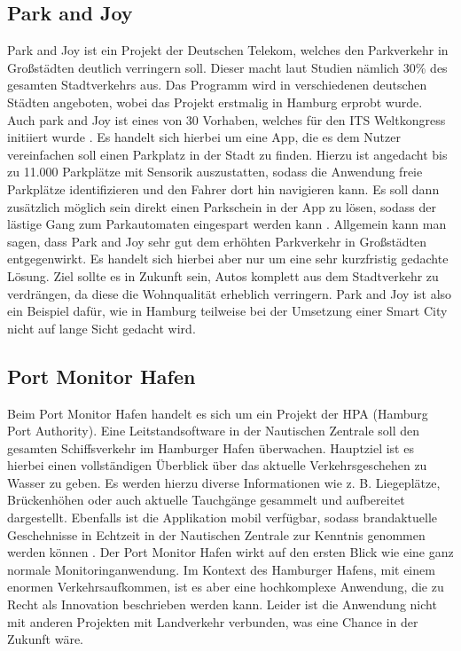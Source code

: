 \subsection{Park and Joy}

Park and Joy ist ein Projekt der Deutschen Telekom, welches den Parkverkehr in Großstädten deutlich verringern soll. Dieser macht laut Studien nämlich 30\% des gesamten Stadtverkehrs aus. Das Programm wird in verschiedenen deutschen Städten angeboten, wobei das Projekt erstmalig in Hamburg erprobt wurde. Auch park and Joy ist eines von 30 Vorhaben, welches für den ITS Weltkongress initiiert wurde \autocite[vgl.][]{SmartCityKompass.2020a}.
Es handelt sich hierbei um eine App, die es dem Nutzer vereinfachen soll einen Parkplatz in der Stadt zu finden. Hierzu ist angedacht bis zu 11.000 Parkplätze mit Sensorik auszustatten, sodass die Anwendung freie Parkplätze identifizieren und den Fahrer dort hin navigieren kann. Es soll dann zusätzlich möglich sein direkt einen Parkschein in der App zu lösen, sodass der lästige Gang zum Parkautomaten eingespart werden kann \autocite[vgl.][]{ParkandJoy.2020}.
Allgemein kann man sagen, dass Park and Joy sehr gut dem erhöhten Parkverkehr in Großstädten entgegenwirkt. Es handelt sich hierbei aber nur um eine sehr kurzfristig gedachte Lösung. Ziel sollte es in Zukunft sein, Autos komplett aus dem Stadtverkehr zu verdrängen, da diese die Wohnqualität erheblich verringern. Park and Joy ist also ein Beispiel dafür, wie in Hamburg teilweise bei der Umsetzung einer Smart City nicht auf lange Sicht gedacht wird.

\subsection{Port Monitor Hafen}

Beim Port Monitor Hafen handelt es sich um ein Projekt der HPA (Hamburg Port Authority).
Eine Leitstandsoftware in der Nautischen Zentrale soll den gesamten Schiffsverkehr im Hamburger Hafen überwachen. Hauptziel ist es hierbei einen vollständigen Überblick über das aktuelle Verkehrsgeschehen zu Wasser zu geben.
Es werden hierzu diverse Informationen wie z. B. Liegeplätze, Brückenhöhen oder auch aktuelle Tauchgänge gesammelt und aufbereitet dargestellt.
Ebenfalls ist die Applikation mobil verfügbar, sodass brandaktuelle Geschehnisse in Echtzeit in der Nautischen Zentrale zur Kenntnis genommen werden können \autocite[vgl.][]{SmartCityKompass.2020b}.
Der Port Monitor Hafen wirkt auf den ersten Blick wie eine ganz normale Monitoringanwendung.
Im Kontext des Hamburger Hafens, mit einem enormen Verkehrsaufkommen, ist es aber eine hochkomplexe Anwendung, die zu Recht als Innovation beschrieben werden kann.
Leider ist die Anwendung nicht mit anderen Projekten mit Landverkehr verbunden, was eine Chance in der Zukunft wäre.

